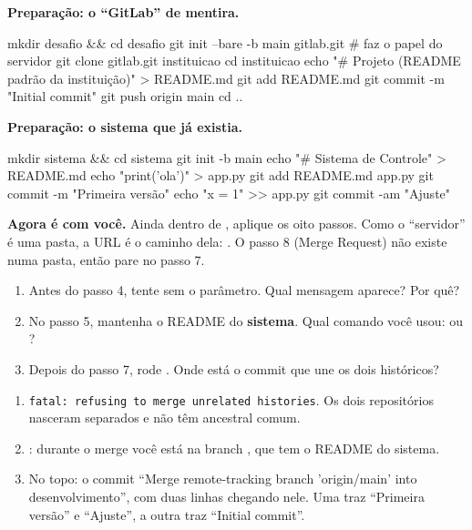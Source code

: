 \textbf{Preparação: o \enquote{GitLab} de mentira.}

\begin{terminal}
mkdir desafio && cd desafio
git init --bare -b main gitlab.git       # faz o papel do servidor
git clone gitlab.git instituicao
cd instituicao
echo "# Projeto (README padrão da instituição)" > README.md
git add README.md
git commit -m "Initial commit"
git push origin main
cd ..
\end{terminal}

\textbf{Preparação: o sistema que já existia.}

\begin{terminal}
mkdir sistema && cd sistema
git init -b main
echo "# Sistema de Controle" > README.md
echo "print('ola')" > app.py
git add README.md app.py
git commit -m "Primeira versão"
echo "x = 1" >> app.py
git commit -am "Ajuste"
\end{terminal}

\textbf{Agora é com você.} Ainda dentro de , aplique os oito passos. Como o \enquote{servidor} é uma pasta, a URL é o caminho dela: . O passo 8 (Merge Request) não existe numa pasta, então pare no passo 7.

\begin{enumerate}
  \item Antes do passo 4, tente  sem o parâmetro. Qual mensagem aparece? Por quê?
  \item No passo 5, mantenha o README do \textbf{sistema}. Qual comando você usou:  ou ?
  \item Depois do passo 7, rode . Onde está o commit que une os dois históricos?
\end{enumerate}

\begin{tcolorbox}[base, colback=cinzaSuave, colframe=cinzaSuave, title={\faKey\enspace Respostas}, coltitle=azulMB, attach title to upper={\\[2pt]}]
\begin{enumerate}
  \item \texttt{fatal: refusing to merge unrelated histories}. Os dois repositórios nasceram separados e não têm ancestral comum.
  \item {}: durante o merge você está na branch , que tem o README do sistema.
  \item No topo: o commit \enquote{Merge remote-tracking branch 'origin/main' into desenvolvimento}, com duas linhas chegando nele. Uma traz \enquote{Primeira versão} e \enquote{Ajuste}, a outra traz \enquote{Initial commit}.
\end{enumerate}
\end{tcolorbox}


